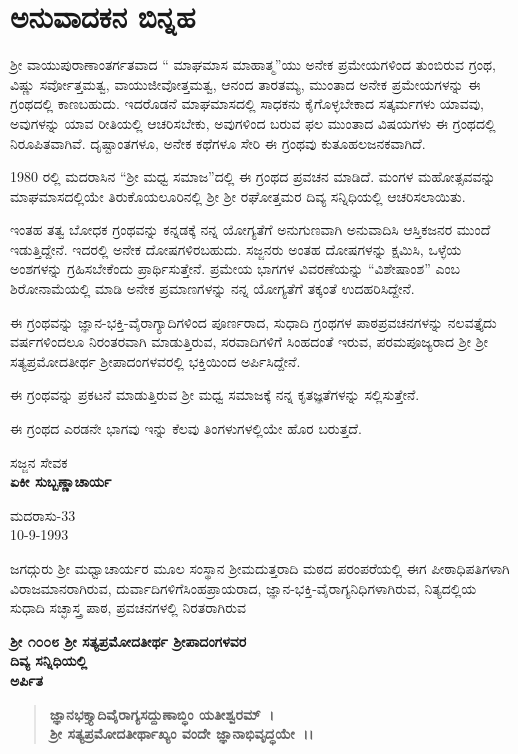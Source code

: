 
\chapter*{ಅನುವಾದಕನ ಬಿನ್ನಹ}

 ಶ‍್ರೀ ವಾಯುಪುರಾಣಾಂತರ್ಗತವಾದ “ ಮಾಘಮಾಸ ಮಾಹಾತ್ಮ”ಯು ಅನೇಕ ಪ್ರಮೇಯಗಳಿಂದ ತುಂಬಿರುವ ಗ್ರಂಥ, ವಿಷ್ಣು ಸರ್ವೋತ್ತಮತ್ವ, ವಾಯುಜೀವೋತ್ತಮತ್ವ, ಆನಂದ ತಾರತಮ್ಯ, ಮುಂತಾದ ಅನೇಕ ಪ್ರಮೇಯಗಳನ್ನು ಈ ಗ್ರಂಥದಲ್ಲಿ ಕಾಣಬಹುದು. ಇದರೊಡನೆ ಮಾಘಮಾಸದಲ್ಲಿ ಸಾಧಕನು ಕೈಗೊಳ್ಳಬೇಕಾದ ಸತ್ಕರ್ಮಗಳು ಯಾವವು, ಅವುಗಳನ್ನು ಯಾವ ರೀತಿಯಲ್ಲಿ ಆಚರಿಸಬೇಕು, ಅವುಗಳಿಂದ ಬರುವ ಫಲ ಮುಂತಾದ ವಿಷಯಗಳು ಈ ಗ್ರಂಥದಲ್ಲಿ ನಿರೂಪಿತವಾಗಿವೆ. ದೃಷ್ಟಾಂತಗಳೂ, ಅನೇಕ ಕಥೆಗಳೂ ಸೇರಿ ಈ ಗ್ರಂಥವು ಕುತೂಹಲಜನಕವಾಗಿದೆ.

1980 ರಲ್ಲಿ ಮದರಾಸಿನ “ಶ‍್ರೀ ಮಧ್ವ ಸಮಾಜ”ದಲ್ಲಿ ಈ ಗ್ರಂಥದ ಪ್ರವಚನ ಮಾಡಿದೆ. ಮಂಗಳ ಮಹೋತ್ಸವವನ್ನು ಮಾಘಮಾಸದಲ್ಲಿಯೇ ತಿರುಕೊಯಲೂರಿನಲ್ಲಿ ಶ‍್ರೀ ಶ‍್ರೀ ರಘೋತ್ತಮರ ದಿವ್ಯ ಸನ್ನಿಧಿಯಲ್ಲಿ ಆಚರಿಸಲಾಯಿತು.

ಇಂತಹ ತತ್ವ ಬೋಧಕ ಗ್ರಂಥವನ್ನು ಕನ್ನಡಕ್ಕೆ ನನ್ನ ಯೋಗ್ಯತೆಗೆ ಅನುಗುಣವಾಗಿ ಅನುವಾದಿಸಿ ಆಸ್ತಿಕಜನರ ಮುಂದೆ ಇಡುತ್ತಿದ್ದೇನೆ. ಇದರಲ್ಲಿ ಅನೇಕ ದೋಷಗಳಿರಬಹುದು. ಸಜ್ಜನರು ಅಂತಹ ದೋಷಗಳನ್ನು ಕ್ಷಮಿಸಿ, ಒಳ್ಳೆಯ ಅಂಶಗಳನ್ನು ಗ್ರಹಿಸಬೇಕೆಂದು ಪ್ರಾರ್ಥಿಸು\-ತ್ತೇನೆ. ಪ್ರಮೇಯ ಭಾಗಗಳ ವಿವರಣೆಯನ್ನು “ವಿಶೇಷಾಂಶ” ಎಂಬ ಶಿರೋನಾಮೆಯಲ್ಲಿ ಮಾಡಿ ಅನೇಕ ಪ್ರಮಾಣಗಳನ್ನು ನನ್ನ ಯೋಗ್ಯತೆಗೆ ತಕ್ಕಂತೆ ಉದಹರಿಸಿದ್ದೇನೆ.

ಈ ಗ್ರಂಥವನ್ನು ಜ್ಞಾನ-ಭಕ್ತಿ-ವೈರಾಗ್ಯಾದಿಗಳಿಂದ ಪೂರ್ಣರಾದ, ಸುಧಾದಿ ಗ್ರಂಥಗಳ ಪಾಠಪ್ರವಚನಗಳನ್ನು ನಲವತ್ತೈದು ವರ್ಷಗಳಿಂದಲೂ ನಿರಂತರವಾಗಿ ಮಾಡುತ್ತಿರುವ, ಸರವಾದಿಗಳಿಗೆ ಸಿಂಹದಂತೆ ಇರುವ, ಪರಮಪೂಜ್ಯರಾದ ಶ‍್ರೀ ಶ‍್ರೀ ಸತ್ಯಪ್ರಮೋದತೀರ್ಥ ಶ‍್ರೀಪಾದಂಗಳವರಲ್ಲಿ ಭಕ್ತಿಯಿಂದ ಅರ್ಪಿಸಿದ್ದೇನೆ.

\newpage

ಈ ಗ್ರಂಥವನ್ನು ಪ್ರಕಟನೆ ಮಾಡುತ್ತಿರುವ ಶ‍್ರೀ ಮಧ್ವ ಸಮಾಜಕ್ಕೆ ನನ್ನ ಕೃತಜ್ಞತೆಗಳನ್ನು ಸಲ್ಲಿಸುತ್ತೇನೆ.

ಈ ಗ್ರಂಥದ ಎರಡನೇ ಭಾಗವು ಇನ್ನು ಕೆಲವು ತಿಂಗಳುಗಳಲ್ಲಿಯೇ ಹೊರ ಬರುತ್ತದೆ.

\begin{flushright}
ಸಜ್ಜನ ಸೇವಕ \\\textbf{ ಏಕೀ ಸುಬ್ಬಣ್ಣಾಚಾರ್ಯ}
\end{flushright}

\begin{flushleft}
ಮದರಾಸು-33 \\ 10-9-1993
\end{flushleft}

\newpage

\begin{center}
\end{center}

ಜಗದ್ಗುರು ಶ‍್ರೀ ಮಧ್ವಾಚಾರ್ಯರ ಮೂಲ ಸಂಸ್ಥಾನ ಶ‍್ರೀಮದುತ್ತರಾದಿ ಮಠದ ಪರಂಪರೆಯಲ್ಲಿ ಈಗ ಪೀಠಾಧಿಪತಿಗಳಾಗಿ ವಿರಾಜಮಾನರಾಗಿರುವ, ದುರ್ವಾದಿಗಳಿಗೆ\break ಸಿಂಹಪ್ರಾಯರಾದ, ಜ್ಞಾನ-ಭಕ್ತಿ-ವೈರಾಗ್ಯನಿಧಿಗಳಾಗಿರುವ, ನಿತ್ಯದಲ್ಲಿಯ ಸುಧಾದಿ ಸಚ್ಛಾಸ್ತ್ರ ಪಾಠ, ಪ್ರವಚನಗಳಲ್ಲಿ ನಿರತರಾಗಿರುವ

\begin{center}
\textbf{ಶ‍್ರೀ ೧೦೦೮ ಶ‍್ರೀ ಸತ್ಯಪ್ರಮೋದತೀರ್ಥ ಶ‍್ರೀಪಾದಂಗಳವರ} \\\textbf{ದಿವ್ಯ ಸನ್ನಿಧಿಯಲ್ಲಿ} \\\textbf{ಅರ್ಪಿತ} 
\end{center}

\begin{verse}
\textbf{ಜ್ಞಾನಭಕ್ತ್ಯಾದಿವೈರಾಗ್ಯಸದ್ದುಣಾಬ್ಧಿಂ ಯತೀಶ್ವರಮ್~।}\\\textbf{ಶ‍್ರೀ ಸತ್ಯಪ್ರಮೋದತೀರ್ಥಾಖ್ಯಂ ವಂದೇ ಜ್ಞಾನಾಭಿವೃದ್ಧಯೇ~।।}
\end{verse}

\emptypage

